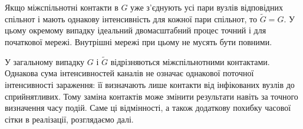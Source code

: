 Якщо міжспільнотні контакти в $G$ уже з’єднують усі пари
вузлів відповідних спільнот і мають однакову інтенсивність
для кожної пари спільнот, то $\tilde G=G$. У цьому окремому
випадку ідеальний двомасштабний процес точний і для початкової
мережі. Внутрішні мережі при цьому не мусять бути повними.

У загальному випадку $G$ і $\tilde G$ відрізняються
міжспільнотними контактами. Однакова сума інтенсивностей
каналів не означає однакової поточної інтенсивності зараження:
її визначають лише контакти від інфікованих вузлів до
сприйнятливих. Тому заміна контактів може змінити результати
навіть за точного визначення часу подій. Саме ці відмінності,
а також додаткову похибку часової сітки в реалізації,
розглядаємо далі.

